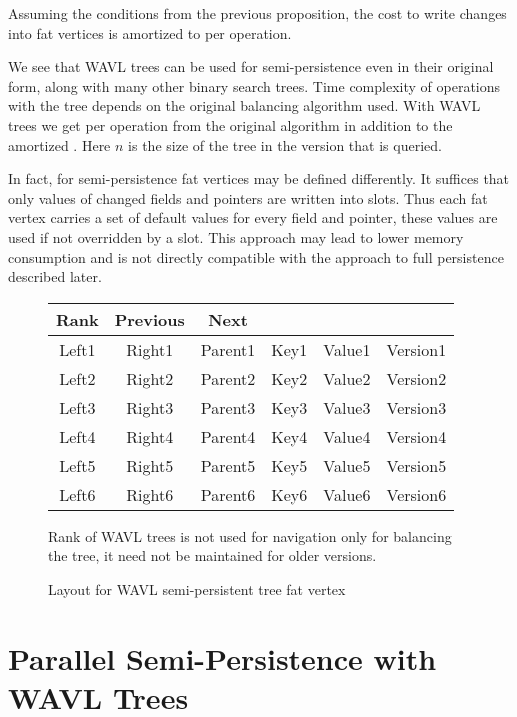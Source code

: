 \begin{obs}
Assuming the conditions from the previous proposition, the cost to write changes into fat vertices is amortized to  per operation.
\end{obs}

We see that WAVL trees can be used for semi-persistence even in their original form, along with many other binary search trees. Time complexity of operations with the tree depends on the original balancing algorithm used. With WAVL trees we get  per operation from the original algorithm in addition to the amortized . Here $n$ is the size of the tree in the version that is queried.

In fact, for semi-persistence fat vertices may be defined differently. It suffices that only values of changed fields and pointers are written into slots. Thus each fat vertex carries a set of default values for every field and pointer, these values are used if not overridden by a slot. This approach may lead to lower memory consumption and is not directly compatible with the approach to full persistence described later.

\begin{figure}
\begin{center}
	\ttfamily
	\begin{tabular}{cccccc}
		Rank  & Previous &  Next   &      & &          \\ \hline
		Left1 &  Right1  & Parent1 & Key1 & Value1 &  Version1 \\ \hline
		Left2 &  Right2  & Parent2 & Key2 & Value2 & Version2 \\ \hline
		Left3 &  Right3  & Parent3 & Key3 & Value3 & Version3 \\ \hline
		Left4 &  Right4  & Parent4 & Key4 & Value4 & Version4 \\ \hline
		Left5 &  Right5  & Parent5 & Key5 & Value5 & Version5 \\ \hline
		Left6 &  Right6  & Parent6 & Key6 & Value6 & Version6 \\ \hline
	\end{tabular}
\end{center}
Rank of WAVL trees is not used for navigation only for balancing the tree, it need not be maintained for older versions.
\caption{Layout for WAVL semi-persistent tree fat vertex}
\end{figure}

\section{Parallel Semi-Persistence with WAVL Trees}


